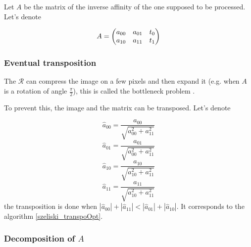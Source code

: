	Let $A$ be the matrix of the inverse affinity of the one supposed to be processed. Let's denote

\[A = \begin{pmatrix} a_{00} & a_{01} & t_0\\ a_{10} & a_{11} & t_1 \end{pmatrix}\]

	
	
	
	\subsubsection{Eventual transposition}
		\label{szeliski_transpoOpt_section}
		
		The $\mathcal R$ can compress the image on a few pixels and then expand it (e.g. when $A$ is a rotation of angle $\frac{\pi}{2}$), this is called the bottleneck problem \cite{wolberg1990digital}.

		
		To prevent this, the image and the matrix can be transposed. Let's denote
		
		\[\hat a_{00} = \frac{a_{00}}{\sqrt{a_{00}^2+a_{11}^2}}\]
		\[\hat a_{01} = \frac{a_{01}}{\sqrt{a_{00}^2+a_{11}^2}}\]
		\[\hat a_{10} = \frac{a_{10}}{\sqrt{a_{10}^2+a_{11}^2}}\]
		\[\hat a_{11} = \frac{a_{11}}{\sqrt{a_{10}^2+a_{11}^2}}\]
		the transposition is done when $|\hat a_{00}|+|\hat a_{11}|<|\hat a_{01}|+|\hat a_{10}|$.
		It corresponds to the algorithm \ref{szeliski_transpoOpt}.
		
	\subsubsection{Decomposition of $A$}
		\label{szeliski_decompositionDeA_section}
		\label{szeliski_frequencesMax_section}
		
